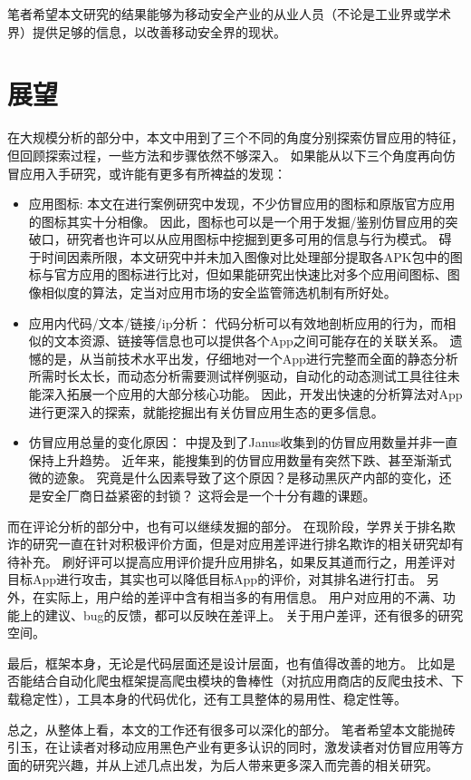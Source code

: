 笔者希望本文研究的结果能够为移动安全产业的从业人员（不论是工业界或学术界）提供足够的信息，以改善移动安全界的现状。

\section{展望}

在大规模分析的部分中，本文中用到了三个不同的角度分别探索仿冒应用的特征，但回顾探索过程，一些方法和步骤依然不够深入。
如果能从以下三个角度再向仿冒应用入手研究，或许能有更多有所裨益的发现：

\begin{itemize}
    \item 应用图标:
    本文在进行案例研究中发现，不少仿冒应用的图标和原版官方应用的图标其实十分相像。
    因此，图标也可以是一个用于发掘/鉴别仿冒应用的突破口，研究者也许可以从应用图标中挖掘到更多可用的信息与行为模式。
    碍于时间因素所限，本文研究中并未加入图像对比处理部分提取各APK包中的图标与官方应用的图标进行比对，但如果能研究出快速比对多个应用间图标、图像相似度的算法，定当对应用市场的安全监管筛选机制有所好处。

    \item 应用内代码/文本/链接/ip分析：
    代码分析可以有效地剖析应用的行为，而相似的文本资源、链接等信息也可以提供各个App之间可能存在的关联关系。
    遗憾的是，从当前技术水平出发，仔细地对一个App进行完整而全面的静态分析所需时长太长，而动态分析需要测试样例驱动，自动化的动态测试工具往往未能深入拓展一个应用的大部分核心功能。
    因此，开发出快速的分析算法对App进行更深入的探索，就能挖掘出有关仿冒应用生态的更多信息。

    \item 仿冒应用总量的变化原因：
    中提及到了Janus收集到的仿冒应用数量并非一直保持上升趋势。
    近年来，能搜集到的仿冒应用数量有突然下跌、甚至渐渐式微的迹象。
    究竟是什么因素导致了这个原因？是移动黑灰产内部的变化，还是安全厂商日益紧密的封锁？
    这将会是一个十分有趣的课题。
\end{itemize}

而在评论分析的部分中，也有可以继续发掘的部分。
在现阶段，学界关于排名欺诈的研究一直在针对积极评价方面，但是对应用差评进行排名欺诈的相关研究却有待补充。
刷好评可以提高应用评价提升应用排名，如果反其道而行之，用差评对目标App进行攻击，其实也可以降低目标App的评价，对其排名进行打击。
另外，在实际上，用户给的差评中含有相当多的有用信息。
用户对应用的不满、功能上的建议、bug的反馈，都可以反映在差评上。
关于用户差评，还有很多的研究空间。

最后，\mytool 框架本身，无论是代码层面还是设计层面，也有值得改善的地方。
比如是否能结合自动化爬虫框架提高爬虫模块的鲁棒性（对抗应用商店的反爬虫技术、下载稳定性），工具本身的代码优化，还有工具整体的易用性、稳定性等。

总之，从整体上看，本文的工作还有很多可以深化的部分。
笔者希望本文能抛砖引玉，在让读者对移动应用黑色产业有更多认识的同时，激发读者对仿冒应用等方面的研究兴趣，并从上述几点出发，为后人带来更多深入而完善的相关研究。

